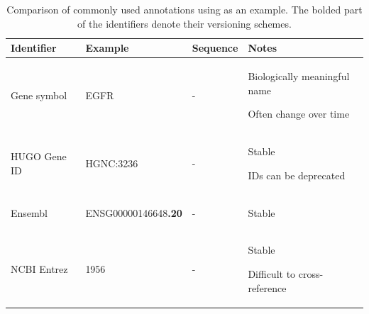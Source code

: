 \begin{SingleSpace}
\begin{table}[tbp]
    \centering
    \caption{Comparison of commonly used annotations using  as an example. The bolded part of the identifiers denote their versioning schemes.}
    \label{tab:intro-anno}

    \footnotesize
    \begin{subtable}{1\linewidth}
        \centering
        \label{tab:intro-anno-gene}
        \begin{tabular}{lllp{15em}}
            \toprule
            Identifier      & Example   & Sequence  & Notes \\
            \midrule
            Gene symbol     & EGFR      & -         &
            \begin{tablist}
                \item Biologically meaningful name
                \item Often change over time
            \end{tablist}\\
            HUGO Gene ID    & HGNC:3236 & -         &
            \begin{tablist}
                \item Stable
                \item IDs can be deprecated
            \end{tablist}\\
            Ensembl         & ENSG00000146648\textbf{.20} & - &
            \begin{tablist}
                \item Stable
            \end{tablist} \\
            NCBI Entrez	    & 1956      & -         &
            \begin{tablist}
                \item Stable
                \item Difficult to cross-reference
            \end{tablist} \\
            \bottomrule
        \end{tabular}
    \end{subtable}


\end{table}
\end{SingleSpace}
